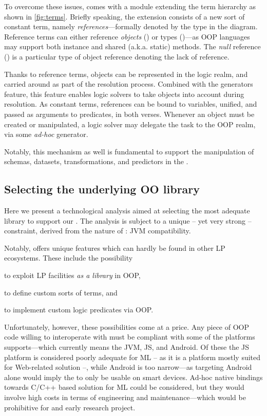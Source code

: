 \documentclass[12pt,a4paper,openright,twoside]{book}
\begin{document}
To overcome these issues, \twopkt{} comes with a  module extending the term hierarchy as shown in \cref{fig:terms}.
%
Briefly speaking, the extension consists of a new sort of constant term, namely \emph{references}---formally denoted by the  type in the diagram.
%
Reference terms can either reference \emph{objects} () or types ()---as OOP languages may support both instance and shared (a.k.a. static) methods.
%
The \emph{null} reference () is a particular type of object reference denoting the lack of reference.

Thanks to reference terms, objects can be represented in the logic realm, and carried around as part of the resolution process.
%
Combined with the generators feature, this feature enables logic solvers to take objects into account during resolution.
%
As constant terms, references can be bound to variables, unified, and passed as arguments to predicates, in both verses.
%
Whenever an object must be created or manipulated, a logic solver may delegate the task to the OOP realm, via some \emph{ad-hoc} generator.

Notably, this mechanism as well is fundamental to support the manipulation of schemas, datasets, transformations, and predictors in the \mllib{}.

\subsection{Selecting the underlying OO library}

Here we present a technological analysis aimed at selecting the most adequate library to support our \mllib{}.
%
The analysis is subject to a unique -- yet very strong -- constraint, derived from the nature of \twopkt{}: JVM compatibility.

Notably, \twopkt{} offers unique features which can hardly be found in other LP ecosystems.
%
These include the possibility
%
\begin{inlinelist}
    \item to exploit LP facilities \emph{as a library} in OOP,
    \item to define custom sorts of terms, and
    \item to implement custom logic predicates via OOP.
\end{inlinelist}
%
Unfortunately, however, these possibilities come at a price.
%
Any piece of OOP code willing to interoperate with \twopkt{} must be compliant with some of the platforms \twopkt{} supports---which currently means the JVM, JS, and Android.
%
Of these the JS platform is considered poorly adequate for ML -- as it is a platform mostly suited for Web-related solution --, while Android is too narrow---as targeting Android alone would imply the \mllib{} to only be usable on smart devices.
%
Ad-hoc native bindings towards C/C++ based solution for ML could be considered, but they would involve high costs in terms of engineering and maintenance---which would be prohibitive for and early research project.
\end{document}
